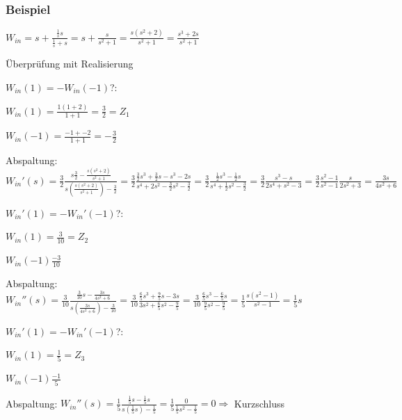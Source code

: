 \subsubsection{Beispiel}


$W_{in} = s + \frac{\frac{1}{s} s}{\frac{1}{s} + s} = s + \frac{s}{s^2 + 1} = \frac{s(s^2 + 2)}{s^2 + 1} = \frac{s^3 + 2s}{s^2 + 1}$

Überprüfung mit Realisierung
\begin{penumerate}
    \item $W_{in}(1) = -W_{in}(-1)$?:
    \begin{pitemize}
        \item $W_{in}(1) = \frac{1(1 + 2)}{1 +1} = \frac{3}{2} = Z_1$
        \item $W_{in}(-1) = \frac{-1 + -2}{1 + 1} = -\frac{3}{2}$
    \end{pitemize}
    \item Abspaltung: $W_{in}'(s) = \frac{3}{2} \frac{s\frac{3}{2} - \frac{s(s^2 + 2)}{s^2 + 1}}{s(\frac{s(s^2 + 2)}{s^2 + 1}) - \frac{3}{2}} = \frac{3}{2} \frac{\frac{3}{2}s^3 + \frac{3}{2}s - s^3 - 2s}{s^4 + 2s^2 - \frac{3}{2}s^2 - \frac{3}{2}}  = \frac{3}{2}\frac{\frac{1}{2}s^3 - \frac{1}{2} s}{s^4 + \frac{1}{2}s^2 - \frac{3}{2}} = \frac{3}{2}\frac{s^3 - s}{2s^4 + s^2 - 3} = \frac{3}{2}\frac{s^2 - 1}{s^2 - 1}\frac{s}{2s^2 + 3} = \frac{3s}{4s^2 + 6}$
    \item $W_{in}'(1) = -W_{in}'(-1)$?:
    \begin{pitemize}
        \item $W_{in}(1) = \frac{3}{10} = Z_2$
        \item $W_{in}(-1) \frac{-3}{10}$
    \end{pitemize}
    \item Abspaltung: $W_{in}''(s) = \frac{3}{10} \frac{\frac{3}{10}s - \frac{3s}{4s^2 + 6}}{s(\frac{3s}{4s^2 + 6}) - \frac{3}{10}} = \frac{3}{10} \frac{\frac{6}{5} s^3 + \frac{9}{5} s - 3s}{3s^2 + \frac{6}{5} s^2 - \frac{9}{5}} = \frac{3}{10} \frac{\frac{6}{5}s^3 - \frac{6}{5}s}{\frac{9}{5}s^2 - \frac{9}{5}} = \frac{1}{5} \frac{s(s^2 -1)}{s^2 - 1} = \frac{1}{5}s$
    \item $W_{in}'(1) = -W_{in}'(-1)$?:
    \begin{pitemize}
        \item $W_{in}(1) = \frac{1}{5} = Z_3$
        \item $W_{in}(-1) \frac{-1}{5}$
    \end{pitemize}
    \item Abspaltung: $W_{in}''(s) = \frac{1}{5}\frac{\frac{1}{5}s - \frac{1}{5}s}{s(\frac{1}{5}s) - \frac{1}{5}} = \frac{1}{5}\frac{0}{\frac{1}{5}s^2 - \frac{1}{5}} = 0 \Rightarrow$ Kurzschluss 
    \item {}
    \item {}
\end{penumerate}







